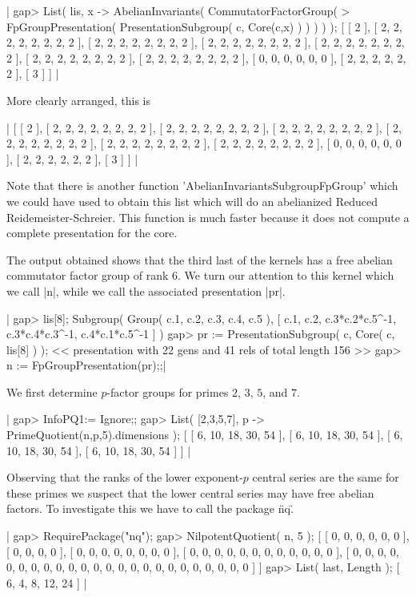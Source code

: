 |    gap> List( lis, x -> AbelianInvariants( CommutatorFactorGroup(
    >   FpGroupPresentation( PresentationSubgroup( c, Core(c,x) ) ) ) ) );
    [ [ 2 ], [ 2, 2, 2, 2, 2, 2, 2, 2 ], [ 2, 2, 2, 2, 2, 2, 2, 2 ],
      [ 2, 2, 2, 2, 2, 2, 2, 2 ], [ 2, 2, 2, 2, 2, 2, 2, 2 ],
      [ 2, 2, 2, 2, 2, 2, 2, 2 ], [ 2, 2, 2, 2, 2, 2, 2, 2 ],
      [ 0, 0, 0, 0, 0, 0 ], [ 2, 2, 2, 2, 2, 2 ], [ 3 ] ] |

More clearly arranged, this is

|    [ [ 2 ],
      [ 2, 2, 2, 2, 2, 2, 2, 2 ],
      [ 2, 2, 2, 2, 2, 2, 2, 2 ],
      [ 2, 2, 2, 2, 2, 2, 2, 2 ],
      [ 2, 2, 2, 2, 2, 2, 2, 2 ],
      [ 2, 2, 2, 2, 2, 2, 2, 2 ],
      [ 2, 2, 2, 2, 2, 2, 2, 2 ],
      [ 0, 0, 0, 0, 0, 0 ],
      [ 2, 2, 2, 2, 2, 2 ],
      [ 3 ] ] |

Note  that  there  is another function 'AbelianInvariantsSubgroupFpGroup'
which we could have used to obtain this list which will do an abelianized
Reduced Reidemeister-Schreier.   This function is  much faster because it
does not compute a complete presentation for the core.

The output obtained shows that the third last  of the kernels has  a free
abelian commutator factor group of rank 6.  We turn our attention to this
kernel which we call |n|, while we call the associated presentation |pr|.

|    gap> lis[8];
    Subgroup( Group( c.1, c.2, c.3, c.4, c.5 ),
    [ c.1, c.2, c.3*c.2*c.5^-1, c.3*c.4*c.3^-1, c.4*c.1*c.5^-1 ] )
    gap> pr := PresentationSubgroup( c, Core( c, lis[8] ) );
    << presentation with 22 gens and 41 rels of total length 156 >>
    gap> n := FpGroupPresentation(pr);;|

We first determine $p$-factor groups for primes $2$, $3$, $5$, and $7$.

|    gap> InfoPQ1:= Ignore;;
    gap> List( [2,3,5,7], p -> PrimeQuotient(n,p,5).dimensions );
    [ [ 6, 10, 18, 30, 54 ], [ 6, 10, 18, 30, 54 ], [ 6, 10, 18, 30, 54 ],
      [ 6, 10, 18, 30, 54 ] ] |

Observing that the ranks of the lower exponent-$p$ central series are the
same for  these primes we suspect that the lower  central series may have
free  abelian factors.  To  investigate this we have  to call the package
\"nq\".

|    gap> RequirePackage("nq");
    gap> NilpotentQuotient( n, 5 );
    [ [ 0, 0, 0, 0, 0, 0 ], [ 0, 0, 0, 0 ], [ 0, 0, 0, 0, 0, 0, 0, 0 ],
      [ 0, 0, 0, 0, 0, 0, 0, 0, 0, 0, 0, 0 ],
      [ 0, 0, 0, 0, 0, 0, 0, 0, 0, 0, 0, 0, 0, 0, 0, 0, 0, 0, 0, 0, 0, 0,
          0, 0 ] ]
    gap> List( last, Length );
    [ 6, 4, 8, 12, 24 ] |

